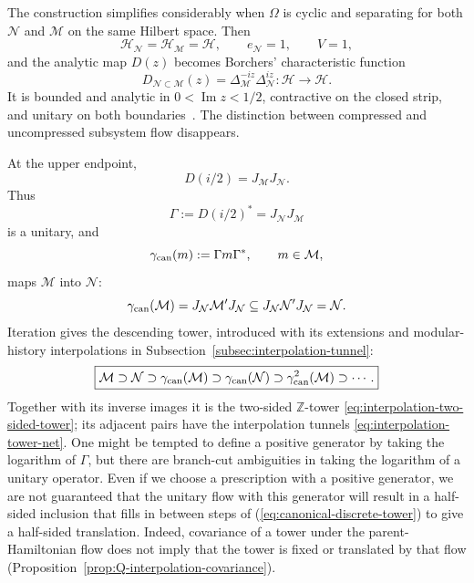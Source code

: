 \documentclass[a4paper,11pt]{article}
\theoremstyle{definition}
\newcommand{\mN}{\mathcal{N}}
\newcommand{\mH}{\mathcal{H}}
\newcommand{\mM}{\mathcal{M}}
\begin{document}
The construction simplifies considerably when $\Omega$ is cyclic and
separating for both $\mN$ and $\mM$ on the same Hilbert space.
Then
\begin{equation}
    \mH_{\mN}=\mH_{\mM}=\mathcal H,
    \qquad
    e_{\mN}=1,
    \qquad
    V=1,
\end{equation}
and the analytic map $D(z)$ becomes Borchers' characteristic function
\begin{equation}
    \boxed{
    D_{\mN\subset\mM}(z)
    =
    \Delta_{\mM}^{-iz}\Delta_{\mN}^{iz}
    :
    \mathcal H\to\mathcal H .
    }
    \label{eq:D-common-probing}
\end{equation}
It is bounded and analytic in
$0<\operatorname{Im}z<1/2$, contractive on the closed strip, and unitary on
both boundaries~\cite{revolutionizing}. The distinction between compressed
and uncompressed subsystem flow disappears.

At the upper endpoint,
\begin{equation}
    \boxed{
    D(i/2)=J_{\mM}J_{\mN} .
    }
    \label{eq:D-half-common}
\end{equation}
Thus
\begin{equation}
    \Gamma:=D(i/2)^*=J_{\mN}J_{\mM}
\end{equation}
is a unitary, and
\begin{equation}
    \gamma_{\rm can}(m)
    :=
    \Gamma m\Gamma^*,
    \qquad
    m\in\mM,
    \label{eq:canonical-endomorphism-common}
\end{equation}
maps $\mM$ into $\mN$:
\begin{equation}
    \gamma_{\rm can}(\mM)
    =
    J_{\mN}\mM'J_{\mN}
    \subseteq
    J_{\mN}\mN'J_{\mN}
    =
    \mN .
\end{equation}
Iteration gives the descending tower, introduced with its extensions
and modular-history interpolations in
Subsection~\ref{subsec:interpolation-tunnel}:
\begin{equation}
    \boxed{
    \mM
    \supset
    \mN
    \supset
    \gamma_{\rm can}(\mM)
    \supset
    \gamma_{\rm can}(\mN)
    \supset
    \gamma_{\rm can}^2(\mM)
    \supset\cdots .
    }
    \label{eq:canonical-discrete-tower}
\end{equation}
Together with its inverse images it is the two-sided $\mathbb Z$-tower
\eqref{eq:interpolation-two-sided-tower}; its adjacent pairs have the
interpolation tunnels \eqref{eq:interpolation-tower-net}.
One might be tempted to define a positive generator by taking the logarithm of $\Gamma$, but there are branch-cut ambiguities in taking the logarithm of a unitary operator. 
Even if we choose a prescription with a positive generator, we are not guaranteed that the unitary flow with this generator will result in a half-sided inclusion that fills in between steps of (\ref{eq:canonical-discrete-tower}) to give a half-sided translation. Indeed, covariance of a tower under the parent-Hamiltonian flow
does not imply that the tower is fixed or translated by that flow
(Proposition~\ref{prop:Q-interpolation-covariance}).
\end{document}
